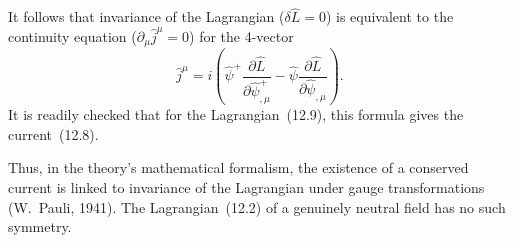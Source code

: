 It follows that invariance of the Lagrangian ($\delta\widehat L=0$) is equivalent to the continuity equation ($\partial_\mu\widehat j^\mu=0$) for the 4-vector
\begin{equation}
\widehat j^\mu=i\left(
\widehat\psi^+\frac{\partial\widehat L}{\partial\widehat\psi^+_{,\mu}}
-\widehat\psi\frac{\partial\widehat L}{\partial\widehat\psi_{,\mu}}
\right).
\tag{12.12}
\end{equation}
It is readily checked that for the Lagrangian~(12.9), this formula gives the current~(12.8).

Thus, in the theory's mathematical formalism, the existence of a conserved current is linked to invariance of the Lagrangian under gauge transformations (W.~Pauli, 1941). The Lagrangian~(12.2) of a genuinely neutral field has no such symmetry.
